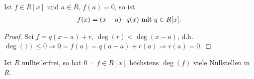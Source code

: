 \begin{conclusion}
	Ist $f \in R[x]$ und $a \in R$, $f(a) = 0$, so ist
	\begin{align}
		f(x) = (x-a)\cdot q(x) \text{ mit } q \in R[x]. \notag
	\end{align}
\end{conclusion}

\begin{proof}
	Sei $f = q(x-a) + r$, $\deg(r) < \deg(x-a)$, d.h. $\deg(1) \leq 0 \Rightarrow 0 = f(a) = q(a-a) + r(a) \Rightarrow r(a) = 0$.
\end{proof}

\begin{conclusion}
	Ist $R$ nullteilerfrei, so hat $0 = f \in R[x]$ höchstens $\deg(f)$ viele Nullstellen in $R$.
\end{conclusion}